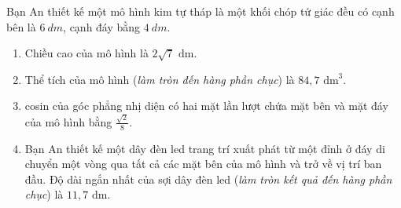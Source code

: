 \begin{baitap}
	Bạn An thiết kế một mô hình kim tự tháp là một khối chóp tứ giác đều có cạnh bên là $\SI{6}{dm}$, cạnh đáy bằng $\SI{4}{dm}$.
	\begin{enumerate}[\quad \bf a)]
		\item Chiều cao của mô hình là $2\sqrt{7}\text{ dm}$.
		\item Thể tích của mô hình (\textit{làm tròn đến hàng phần chục}) là $84{,}7\text{ dm}^3$.
		\item cosin của góc phẳng nhị diện có hai mặt lần lượt chứa mặt bên và mặt đáy của mô hình bằng $\frac{\sqrt{2}}{8}$.
		\item Bạn An thiết kế một dây đèn led trang trí xuất phát từ một đỉnh ở đáy di chuyển một vòng qua tất cả các mặt bên của mô hình và trở về vị trí ban đầu. Độ dài ngắn nhất của sợi dây đèn led (\textit{làm tròn kết quả đến hàng phần chục}) là $11{,}7\text{ dm}$.
	\end{enumerate}
\end{baitap}
